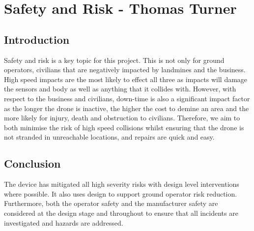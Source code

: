 \section{Safety and Risk - Thomas Turner}\label{Safety and Risk}
\subsection{Introduction}\label{sub_section:tgt_safety_intro}
Safety and risk is a key topic for this project. This is not only for ground operators, civilians that are negatively impacted by landmines and the business. High speed impacts are the most likely to effect all three as impacts will damage the sensors and body as well as anything that it collides with. However, with respect to the business and civilians, down-time is also a significant impact factor as the longer the drone is inactive, the higher the cost to demine an area and the more likely for injury, death and obstruction to civilians. Therefore, we aim to both minimise the risk of high speed collisions whilst ensuring that the drone is not stranded in unreachable locations, and repairs are quick and easy.




\subsection{Conclusion}
The device has mitigated all high severity risks with design level interventions where possible. It also uses design to support ground operator risk reduction. Furthermore, both the operator safety and the manufacturer safety are considered at the design stage and throughout to ensure that all incidents are investigated and hazards are addressed.